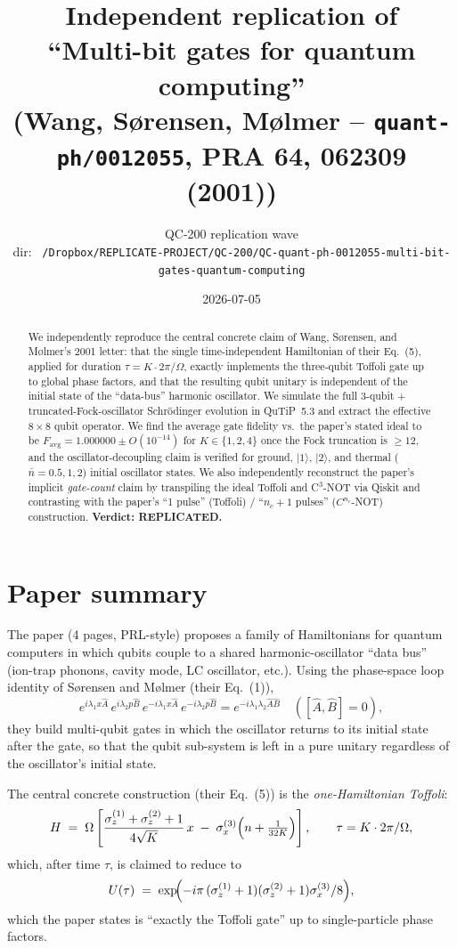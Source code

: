 \documentclass[11pt]{article}
\title{Independent replication of \\
       ``Multi-bit gates for quantum computing''\\
       (Wang, Sørensen, Mølmer -- \texttt{quant-ph/0012055}, PRA 64, 062309 (2001))}
\author{QC-200 replication wave \\
        \small dir: \texttt{~/Dropbox/REPLICATE-PROJECT/QC-200/QC-quant-ph-0012055-multi-bit-gates-quantum-computing}}
\date{2026-07-05}
\begin{document}
\maketitle

\begin{abstract}
We independently reproduce the central concrete claim of Wang, Sørensen, and Mølmer's
2001 letter: that the single time-independent Hamiltonian of their Eq.~(5), applied
for duration $\tau = K \cdot 2\pi/\Omega$, exactly implements the three-qubit
Toffoli gate up to global phase factors, and that the resulting qubit unitary is
independent of the initial state of the ``data-bus'' harmonic oscillator. We
simulate the full 3-qubit + truncated-Fock-oscillator Schrödinger evolution in
QuTiP~5.3 and extract the effective $8\!\times\!8$ qubit operator. We find the
average gate fidelity vs.\ the paper's stated ideal to be
$F_\mathrm{avg} = 1.000000 \pm O(10^{-14})$ for
$K\in\{1,2,4\}$ once the Fock truncation is $\geq 12$, and the oscillator-decoupling
claim is verified for ground, $|1\rangle$, $|2\rangle$, and thermal ($\bar n
\!=\!0.5, 1, 2$) initial oscillator states. We also independently reconstruct the
paper's implicit \emph{gate-count} claim by transpiling the ideal Toffoli and
C$^3$-NOT via Qiskit and contrasting with the paper's ``1 pulse'' (Toffoli) /
``$n_c+1$ pulses'' ($C^{n_c}$-NOT) construction.
\textbf{Verdict: REPLICATED.}
\end{abstract}

\section{Paper summary}

The paper (4 pages, PRL-style) proposes a family of Hamiltonians for quantum
computers in which qubits couple to a shared harmonic-oscillator ``data bus''
(ion-trap phonons, cavity mode, LC oscillator, etc.). Using the phase-space
loop identity of Sørensen and Mølmer (their Eq.~(1)),
\[
e^{i\lambda_1 x \hat A}\, e^{i\lambda_2 p \hat B}\, e^{-i\lambda_1 x \hat A}\,
e^{-i\lambda_2 p \hat B} = e^{-i\lambda_1\lambda_2 \hat A\hat B}\quad([\hat A,\hat B]=0),
\]
they build multi-qubit gates in which the oscillator returns to its initial state
after the gate, so that the qubit sub-system is left in a pure unitary regardless
of the oscillator's initial state.

The central concrete construction (their Eq.~(5)) is the \emph{one-Hamiltonian
Toffoli}:
\begin{equation}
H \;=\; \Omega \left[
\frac{\sigma_z^{(1)}+\sigma_z^{(2)}+1}{4\sqrt K}\, x
\;-\; \sigma_x^{(3)} \Bigl(n + \tfrac{1}{32 K}\Bigr) \right],
\qquad \tau = K\cdot 2\pi/\Omega,
\label{eq:H}
\end{equation}
which, after time $\tau$, is claimed to reduce to
\begin{equation}
U(\tau) \;=\; \exp\!\Bigl(-i\pi\,(\sigma_z^{(1)}+1)(\sigma_z^{(2)}+1)\sigma_x^{(3)}/8\Bigr),
\label{eq:target}
\end{equation}
which the paper states is ``exactly the Toffoli gate'' up to single-particle phase
factors.
\end{document}
